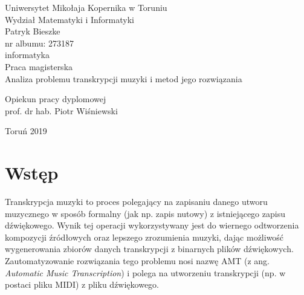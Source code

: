 \documentclass[12pt,a4paper,twoside]{mwart}
\begin{document}
\begin{titlepage}
	\begin{center}
		\large Uniwersytet Mikołaja Kopernika w Toruniu\\
		\large Wydział Matematyki i Informatyki\\
		\vspace{3cm} 
		\large Patryk Bieszke\\
			nr albumu: 273187\\
			informatyka\\
		\vspace{2cm}
		Praca magisterska\\
	
		\vspace{2cm} 
		\huge Analiza problemu transkrypcji muzyki i metod jego rozwiązania\\
	\end{center}
	\hfill
	\begin{minipage}{6cm}
		\vspace{2cm}
		Opiekun pracy dyplomowej\\
		prof. dr hab. Piotr Wiśniewski
	\end{minipage}
	\vspace{3cm}
	\begin{center}
		Toruń 2019\\
	\end{center}
\end{titlepage}



\clearpage
\thispagestyle{empty}
\mbox{}

\tableofcontents

\clearpage

\setcounter{secnumdepth}{0}
\section{Wstęp}\label{sec:wstep}
Transkrypcja muzyki to proces polegający na zapisaniu danego utworu muzycznego w sposób formalny (jak np. zapis nutowy) z istniejącego zapisu dźwiękowego. Wynik tej operacji wykorzystywany jest do wiernego odtworzenia kompozycji źródłowych oraz lepszego zrozumienia muzyki, dając możliwość wygenerowania zbiorów danych transkrypcji z binarnych plików dźwiękowych. Zautomatyzowanie rozwiązania tego problemu nosi nazwę AMT (z ang. \textit{Automatic Music Transcription}) i polega na utworzeniu transkrypcji (np. w postaci pliku MIDI) z pliku dźwiękowego.
\end{document}
